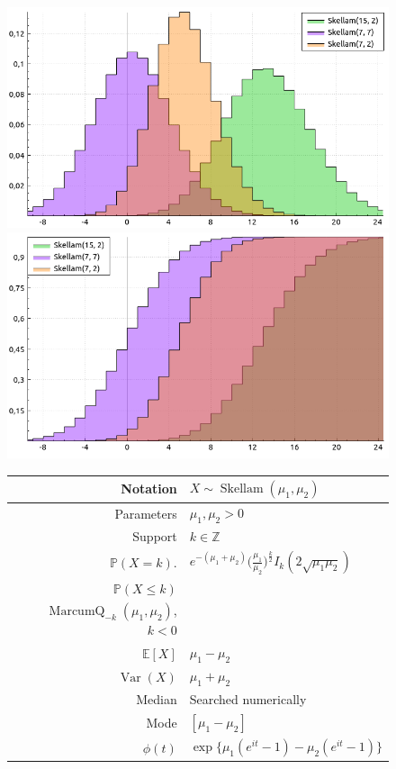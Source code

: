 \documentclass[a4paper,11pt]{article}
\theoremstyle{plain}
\theoremstyle{definition}
\newcommand{\ME}{\mathbb{E}}
\newcommand{\MP}{\mathbb{P}}
\newcommand{\MZ}{\mathbb{Z}}
\newcommand{\Var}{\operatorname{Var}}
\begin{document}
	\begin{figure}[!htb]\centering
		\begin{minipage}{0.55\textwidth}
			\includegraphics[width=\linewidth, right]{skellam_pmf}
			\captionsetup{labelformat=empty}
			\includegraphics[width=\linewidth, right]{skellam_cdf}
			\captionsetup{labelformat=empty}
		\end{minipage}
		\begin{minipage}{0.4\textwidth}
			\begin{tabular}{| r | l |}
				\hline
				Notation & $ X \sim \operatorname{Skellam}(\mu_1, \mu_2) $ \\
				\hline
				Parameters & $\mu_1, \mu_2 > 0$ \\
				\hline
				Support & $ k \in \MZ $  \\
				\hline
				$\MP(X = k)$. & $e^{-(\mu_1 + \mu_2)} \Big( \frac{\mu_1}{\mu_2} \Big)^{\frac{k}{2}} I_k(2\sqrt{\mu_1\mu_2}) $ \\
				\hline
				$\MP(X \leq k)$ & \pbox{\linewidth}{$\operatorname{MarcumP}_{k+1}(\mu_2, \mu_1)$, $k \geq 0$ \\ $\operatorname{MarcumQ}_{-k}(\mu_1, \mu_2)$, $k < 0$ } \\
				\hline
				$\ME[X]$ & $ \mu_1-\mu_2$ \\
				\hline
				$\Var(X)$ & $\mu_1+\mu_2$ \\
				\hline
				Median & Searched numerically \\
				\hline
				Mode & $[ \mu_1-\mu_2] $ \\
				\hline
				$\phi(t)$ & $ \exp \{ \mu_1(e^{it}-1) - \mu_2(e^{it}-1) \}  $ \\
				\hline
			\end{tabular}
		\end{minipage}
	\end{figure}
\end{document}
